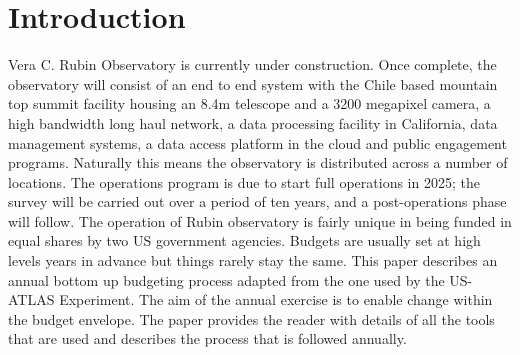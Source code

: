 \section{Introduction} \label{sec:intro}
Vera C. Rubin Observatory\cite{2008arXiv0805.2366I} is currently under construction. Once complete, the observatory will consist of an end to end system  with the Chile based mountain top summit facility housing an 8.4m telescope and a 3200 megapixel camera, a high bandwidth long haul network, a data processing facility in California, data management systems, a data access platform in the cloud and public engagement programs. Naturally this means the observatory is distributed across a number of locations. The operations program is due to start full operations in 2025; the survey will be carried out over a period of ten years, and a post-operations phase will follow. The operation of Rubin observatory is fairly unique in being funded in equal shares by two US government agencies. Budgets are usually set at high levels years in advance but things rarely stay the same. This paper describes an annual bottom up budgeting process adapted from the one used by the US-ATLAS Experiment. The aim of the annual exercise is to enable change within the budget envelope.
The paper provides the reader with details of all the tools that are used and describes the process that is followed annually.
